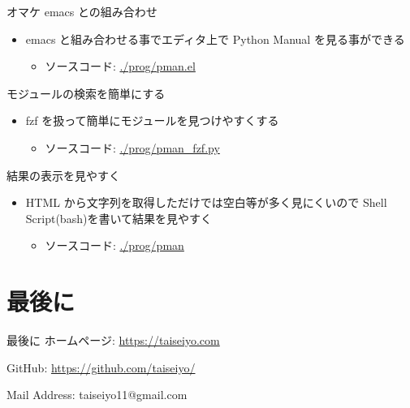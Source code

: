 \documentclass[compress,dvipdfmx,11pt]{beamer}
\begin{document}
\begin{frame}[label={sec:org65c83eb}]{オマケ}
emacs との組み合わせ
\begin{itemize}
\item emacs と組み合わせる事でエディタ上で Python Manual を見る事ができる
\begin{itemize}
\item ソースコード: \url{./prog/pman.el}
\end{itemize}
\end{itemize}

モジュールの検索を簡単にする
\begin{itemize}
\item fzf を扱って簡単にモジュールを見つけやすくする
\begin{itemize}
\item ソースコード: \url{./prog/pman\_fzf.py}
\end{itemize}
\end{itemize}

結果の表示を見やすく
\begin{itemize}
\item HTML から文字列を取得しただけでは空白等が多く見にくいので Shell
Script(bash)を書いて結果を見やすく
\begin{itemize}
\item ソースコード:  \url{./prog/pman}
\end{itemize}
\end{itemize}
\end{frame}



\section{最後に}
\label{sec:orgfc63a36}
\begin{frame}[label={sec:orgd0dfc9c}]{最後に}
ホームページ: \url{https://taiseiyo.com}


GitHub: \url{https://github.com/taiseiyo/}


Mail Address: taiseiyo11@gmail.com
\end{frame}
\end{document}
